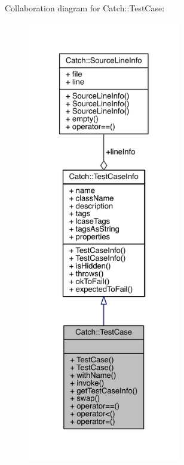Collaboration diagram for Catch\+:\+:Test\+Case\+:\nopagebreak
\begin{figure}[H]
\begin{center}
\leavevmode
\includegraphics[height=550pt]{a00284}
\end{center}
\end{figure}
